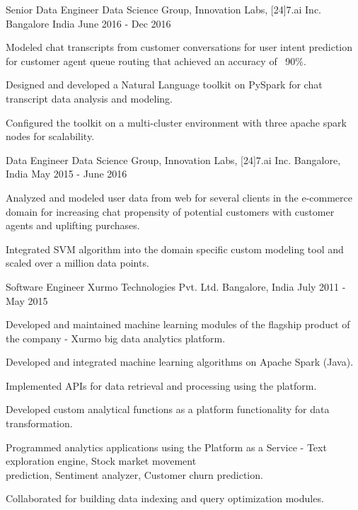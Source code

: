 \begin{cventries}
  \cventry
    {Senior Data Engineer}
    {Data Science Group, Innovation Labs, [24]7.ai Inc.}
    {Bangalore India}
    {June 2016 - Dec 2016}
    {
      \begin{cvitems}
        \item {Modeled chat transcripts from customer conversations for user intent prediction for customer agent queue routing that achieved an accuracy of ~90\%.}
        \item {Designed and developed a Natural Language toolkit on PySpark for chat transcript data analysis and modeling.}
        \item {Configured the toolkit on a multi-cluster environment with three apache spark nodes for scalability.}
      \end{cvitems}
    }
  \cventry
    {Data Engineer}
    {Data Science Group, Innovation Labs, [24]7.ai Inc.}  
    {Bangalore, India}
    {May 2015 - June 2016}
    {
      \begin{cvitems}
        \item {Analyzed and modeled user data from web for several clients in the e-commerce domain for increasing chat propensity of potential customers with customer agents and uplifting purchases.}
        \item {Integrated SVM algorithm into the domain specific custom modeling tool and scaled over a million data points.}
      \end{cvitems}
    }
  \cventry
    {Software Engineer}
    {Xurmo Technologies Pvt. Ltd.}
    {Bangalore, India}
    {July 2011 - May 2015}
    {
      \begin{cvitems}
        \item {Developed and maintained machine learning modules of the flagship product of the company - Xurmo big data analytics platform.}
        \item {Developed and integrated machine learning algorithms on Apache Spark (Java).}
        \item {Implemented APIs for data retrieval and processing using the platform.}
        \item {Developed custom analytical functions as a platform functionality for data transformation.}
        \item {Programmed analytics applications using the Platform as a Service - Text exploration engine, Stock market movement \\ prediction, Sentiment analyzer, Customer churn prediction.}
        \item {Collaborated for building data indexing and query optimization modules.}
      \end{cvitems} 
    }
\end{cventries}
